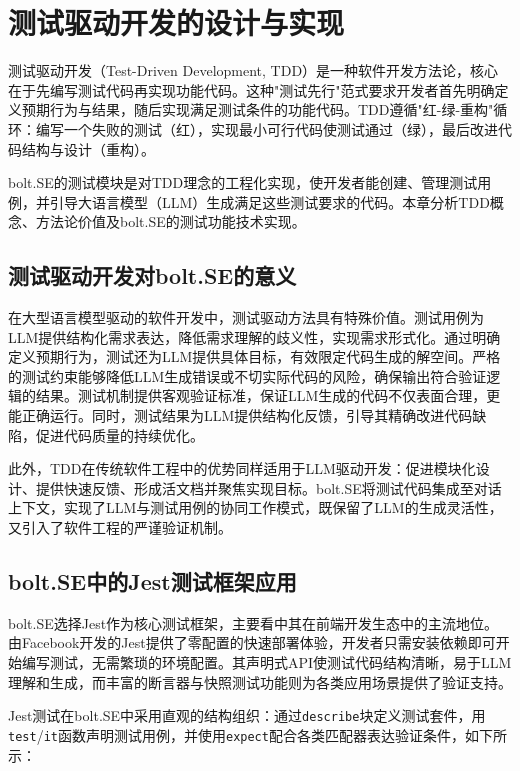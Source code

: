 
\chapter{测试驱动开发的设计与实现}
\label{chap:tdd}

测试驱动开发（Test-Driven Development, TDD）是一种软件开发方法论，核心在于先编写测试代码再实现功能代码。这种"测试先行"范式要求开发者首先明确定义预期行为与结果，随后实现满足测试条件的功能代码。TDD遵循"红-绿-重构"循环：编写一个失败的测试（红），实现最小可行代码使测试通过（绿），最后改进代码结构与设计（重构）。

bolt.SE的测试模块是对TDD理念的工程化实现，使开发者能创建、管理测试用例，并引导大语言模型（LLM）生成满足这些测试要求的代码。本章分析TDD概念、方法论价值及bolt.SE的测试功能技术实现。

\section{测试驱动开发对bolt.SE的意义}

在大型语言模型驱动的软件开发中，测试驱动方法具有特殊价值。测试用例为LLM提供结构化需求表达，降低需求理解的歧义性，实现需求形式化。通过明确定义预期行为，测试还为LLM提供具体目标，有效限定代码生成的解空间。严格的测试约束能够降低LLM生成错误或不切实际代码的风险，确保输出符合验证逻辑的结果。测试机制提供客观验证标准，保证LLM生成的代码不仅表面合理，更能正确运行。同时，测试结果为LLM提供结构化反馈，引导其精确改进代码缺陷，促进代码质量的持续优化。

此外，TDD在传统软件工程中的优势同样适用于LLM驱动开发：促进模块化设计、提供快速反馈、形成活文档并聚焦实现目标。bolt.SE将测试代码集成至对话上下文，实现了LLM与测试用例的协同工作模式，既保留了LLM的生成灵活性，又引入了软件工程的严谨验证机制。

\section{bolt.SE中的Jest测试框架应用}

bolt.SE选择Jest作为核心测试框架，主要看中其在前端开发生态中的主流地位。由Facebook开发的Jest提供了零配置的快速部署体验，开发者只需安装依赖即可开始编写测试，无需繁琐的环境配置\cite{Jest2023}。其声明式API使测试代码结构清晰，易于LLM理解和生成，而丰富的断言器与快照测试功能则为各类应用场景提供了验证支持。

Jest测试在bolt.SE中采用直观的结构组织：通过\texttt{describe}块定义测试套件，用\texttt{test}/\texttt{it}函数声明测试用例，并使用\texttt{expect}配合各类匹配器表达验证条件，如下所示：

